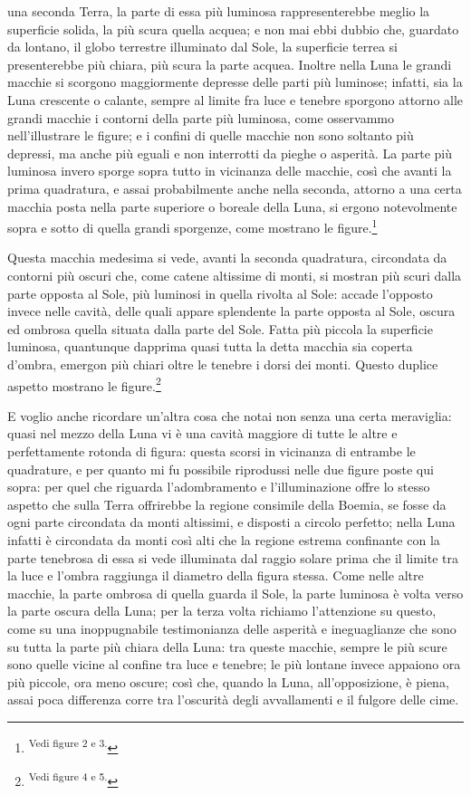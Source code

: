 \documentclass[11pt,twoside,openany]{book}
\begin{document}
una seconda Terra, la parte di essa più luminosa rappresenterebbe meglio la superficie solida, la più scura quella acquea; e non mai ebbi dubbio che, guardato da lontano, il globo terrestre illuminato dal Sole, la superficie terrea si presenterebbe più chiara, più scura la parte acquea. Inoltre nella Luna le grandi macchie si scorgono maggiormente depresse delle parti più luminose; infatti, sia la Luna crescente o calante, sempre al limite fra luce e tenebre sporgono attorno alle grandi macchie i contorni della parte più luminosa, come osservammo nell'illustrare le figure; e i confini di quelle macchie non sono soltanto più depressi, ma anche più eguali e non interrotti da pieghe o asperità. La parte più luminosa invero sporge sopra tutto in vicinanza delle macchie, così che avanti la prima quadratura, e assai probabilmente anche nella seconda, attorno a una certa macchia posta nella parte superiore o boreale della Luna, si ergono notevolmente sopra e sotto di quella grandi sporgenze, come mostrano le figure.\footnote{\textsuperscript{Vedi figure 2 e 3.}}

Questa macchia medesima si vede, avanti la seconda quadratura, circondata da contorni più oscuri che, come catene altissime di monti, si mostran più scuri dalla parte opposta al Sole, più luminosi in quella rivolta al Sole: accade l'opposto invece nelle cavità, delle quali appare splendente la parte opposta al Sole, oscura ed ombrosa quella situata dalla parte del Sole. Fatta più piccola la superficie luminosa, quantunque dapprima quasi tutta la detta macchia sia coperta d'ombra, emergon più chiari oltre le tenebre i dorsi dei monti. Questo duplice aspetto mostrano le figure.\footnote{\textsuperscript{Vedi figure 4 e 5.}}

E voglio anche ricordare un'altra cosa che notai non senza una certa meraviglia: quasi nel mezzo della Luna vi è una cavità maggiore di tutte le altre e perfettamente rotonda di figura: questa scorsi in vicinanza di entrambe le quadrature, e per quanto mi fu possibile riprodussi nelle due figure poste qui sopra: per quel che riguarda l'adombramento e l'illuminazione offre lo stesso aspetto che sulla Terra offrirebbe la regione consimile della Boemia, se fosse da ogni parte circondata da monti altissimi, e disposti a circolo perfetto; nella Luna infatti è circondata da monti così alti che la regione estrema confinante con la parte tenebrosa di essa si vede illuminata dal raggio solare prima che il limite tra la luce e l'ombra raggiunga il diametro della figura stessa. Come nelle altre macchie, la parte ombrosa di quella guarda il Sole, la parte luminosa è volta verso la parte oscura della Luna; per la terza volta richiamo l'attenzione su questo, come su una inoppugnabile testimonianza delle asperità e ineguaglianze che sono su tutta la parte più chiara della Luna: tra queste macchie, sempre le più scure sono quelle vicine al confine tra luce e tenebre; le più lontane invece appaiono ora più piccole, ora meno oscure; così che, quando la Luna, all'opposizione, è piena, assai poca differenza corre tra l'oscurità degli avvallamenti e il fulgore delle cime.
\end{document}
